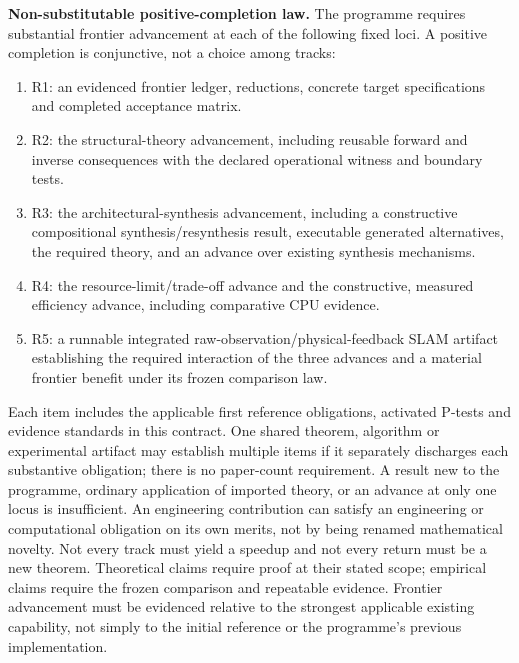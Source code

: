 \documentclass[11pt,letterpaper]{article}
\begin{document}
\textbf{Non-substitutable positive-completion law.} The programme requires substantial frontier advancement at each of the following fixed loci. A positive completion is conjunctive, not a choice among tracks:
\begin{enumerate}[label=\textup{(A\arabic*)},leftmargin=2.5em]
\item R1: an evidenced frontier ledger, reductions, concrete target specifications and completed acceptance matrix.
\item R2: the structural-theory advancement, including reusable forward and inverse consequences with the declared operational witness and boundary tests.
\item R3: the architectural-synthesis advancement, including a constructive compositional synthesis/resynthesis result, executable generated alternatives, the required theory, and an advance over existing synthesis mechanisms.
\item R4: the resource-limit/trade-off advance and the constructive, measured efficiency advance, including comparative CPU evidence.
\item R5: a runnable integrated raw-observation/physical-feedback SLAM artifact establishing the required interaction of the three advances and a material frontier benefit under its frozen comparison law.
\end{enumerate}
Each item includes the applicable first reference obligations, activated P-tests and evidence standards in this contract. One shared theorem, algorithm or experimental artifact may establish multiple items if it separately discharges each substantive obligation; there is no paper-count requirement. A result new to the programme, ordinary application of imported theory, or an advance at only one locus is insufficient. An engineering contribution can satisfy an engineering or computational obligation on its own merits, not by being renamed mathematical novelty. Not every track must yield a speedup and not every return must be a new theorem. Theoretical claims require proof at their stated scope; empirical claims require the frozen comparison and repeatable evidence. Frontier advancement must be evidenced relative to the strongest applicable existing capability, not simply to the initial reference or the programme's previous implementation.
\end{document}
